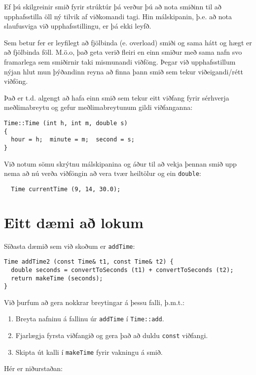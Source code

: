 Ef þú skilgreinir smið fyrir strúktúr þá verður þú að nota smiðinn til að upphafsstilla öll ný tilvik af viðkomandi tagi.
Hin málskipanin, þ.e. að nota slaufusviga við upphafsstillingu, er þá ekki leyfð.

Sem betur fer er leyfilegt að fjölbinda (e. overload) smiði og sama hátt og hægt er að fjölbinda föll.
M.ö.o, það geta verið fleiri en einn smiður með sama nafn svo framarlega sem smiðirnir taki mismunandi viðföng.
Þegar við upphafsstillum nýjan hlut mun þýðandinn reyna að finna þann smið sem tekur viðeigandi/rétt viðföng.

Það er t.d. algengt að hafa einn smið sem tekur eitt viðfang fyrir sérhverja meðlimabreytu og gefur meðlimabreytunum gildi viðfanganna:

\begin{verbatim}
Time::Time (int h, int m, double s)
{
  hour = h;  minute = m;  second = s;
}
\end{verbatim}
%
Við notum sömu skrýtnu málskipanina og áður til að vekja þennan smið upp nema að nú verða viðföngin að vera tvær heiltölur og ein {\tt double}:

\begin{verbatim}
  Time currentTime (9, 14, 30.0);
\end{verbatim}

\section {Eitt dæmi að lokum}

Síðasta dæmið sem við skoðum er {\tt addTime}:

\begin{verbatim}
Time addTime2 (const Time& t1, const Time& t2) {
  double seconds = convertToSeconds (t1) + convertToSeconds (t2);
  return makeTime (seconds);
}
\end{verbatim}
%
Við þurfum að gera nokkrar breytingar á þessu falli, þ.m.t.:

\begin{enumerate}

\item Breyta nafninu á fallinu úr {\tt addTime} í {\tt Time::add}.

\item Fjarlægja fyrsta viðfangið og gera það að duldu {\tt const} viðfangi.

\item Skipta út kalli í {\tt makeTime} fyrir vakningu á smið. 

\end{enumerate}
%
Hér er niðurstaðan:

